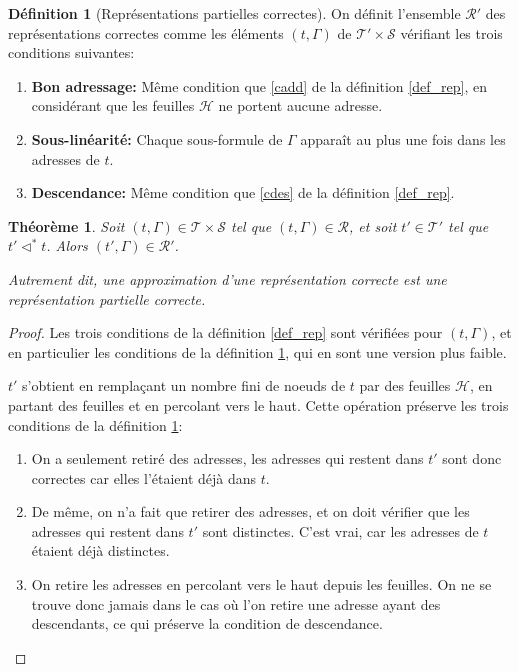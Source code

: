 \documentclass[11pt,a4paper]{article}
\theoremstyle{plain}
\newtheorem{theorem}{Théorème}
\theoremstyle{definition}
\newtheorem{definition}{Définition}
\theoremstyle{remark}
\newcommand*{\sequent}{\Gamma}
\newcommand*{\sequents}{\ensuremath{\mathcal{S}}}
\newcommand*{\trees}{\ensuremath{\mathcal{T}}}
\newcommand*{\treespartial}{\ensuremath{\mathcal{T'}}}
\newcommand*{\representationslarge}{\ensuremath{\trees \times \sequents}}
\newcommand*{\representations}{\ensuremath{\mathcal{R}}}
\newcommand*{\representationspartiallarge}{\ensuremath{\treespartial \times \sequents}}
\newcommand*{\representationspartial}{\ensuremath{\mathcal{R'}}}
\newcommand*{\relapprox}{\ensuremath{\triangleleft}}
\newcommand*{\relapproxlarge}{\ensuremath{\relapprox^*}}
\newcommand*{\unknown}{\mathcal{H}}
\begin{document}
\begin{definition}[Représentations partielles correctes]
    \label{def_rep_partial}
    On définit l'ensemble \representationspartial{} des représentations correctes comme les éléments $(t, \sequent)$ de $\representationspartiallarge$ vérifiant les trois conditions suivantes:
    
    \begin{enumerate}
    \item\label{caddpartial} \textbf{Bon adressage:} Même condition que \ref{cadd} de la définition \ref{def_rep}, en considérant que les feuilles $\unknown$ ne portent aucune adresse.
    \item\label{clinpartial} \textbf{Sous-linéarité:} Chaque sous-formule de $\sequent$ apparaît au plus une fois dans les adresses de $t$.
    \item\label{cdespartial} \textbf{Descendance:} Même condition que \ref{cdes} de la définition \ref{def_rep}.
    \end{enumerate}
\end{definition}

\begin{theorem}
    Soit $(t, \sequent) \in \representationslarge$ tel que $(t, \sequent) \in \representations$, et soit $t' \in \treespartial$ tel que $t' \relapproxlarge t$. Alors $(t', \sequent) \in \representationspartial$.
    
    Autrement dit, une approximation d'une représentation correcte est une représentation partielle correcte.
\end{theorem}

\begin{proof}
    Les trois conditions de la définition \ref{def_rep} sont vérifiées pour $(t, \sequent)$, et en particulier les conditions de la définition \ref{def_rep_partial}, qui en sont une version plus faible. 
    
    $t'$ s'obtient en remplaçant un nombre fini de noeuds de $t$ par des feuilles $\unknown$, en partant des feuilles et en percolant vers le haut. Cette opération préserve les trois conditions de la définition \ref{def_rep_partial}:

    \begin{enumerate}
        \item On a seulement retiré des adresses, les adresses qui restent dans $t'$ sont donc correctes car elles l'étaient déjà dans $t$.

        \item De même, on n'a fait que retirer des adresses, et on doit vérifier que les adresses qui restent dans $t'$ sont distinctes. C'est vrai, car les adresses de $t$ étaient déjà distinctes.

        \item On retire les adresses en percolant vers le haut depuis les feuilles. On ne se trouve donc jamais dans le cas où l'on retire une adresse ayant des descendants, ce qui préserve la condition de descendance.
    \end{enumerate}
\end{proof}
\end{document}
